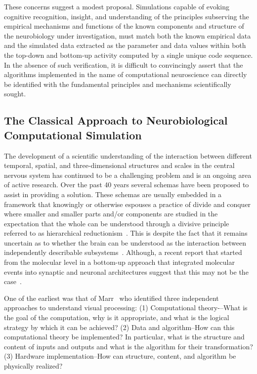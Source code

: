 \documentclass{article}
\begin{document}
These concerns suggest a modest proposal. Simulations capable of evoking cognitive recognition, insight, and understanding of the principles subserving the empirical mechanisms and functions of the known components and structure of the neurobiology under investigation, must match both the known empirical data and the simulated data extracted as the parameter and data values within both the top-down and bottom-up activity computed by a single unique code sequence. In the absence of such verification, it is difficult to convincingly assert that the algorithms implemented in the name of computational neuroscience can directly be identified with the fundamental principles and mechanisms scientifically sought.

\subsection{The Classical Approach to Neurobiological Computational Simulation}

The development of a scientific understanding of the interaction between different temporal, spatial, and three-dimensional structures and scales in the central nervous system has continued to be a challenging problem and is an ongoing area of active research.  Over the past 40 years several schemas have been proposed to assist in providing a solution.  These schemas are usually embedded in a framework that knowingly or otherwise espouses a practice of divide and conquer where smaller and smaller parts and/or components are studied in the expectation that the whole can be understood through a divisive principle referred to as hierarchical reductionism~\cite{dawkins06}. This is despite the fact that it remains uncertain as to whether the brain can be understood as the interaction between independently describable subsystems~\cite{djurfeldt08}. Although, a recent report that started from the molecular level in a bottom-up approach that integrated molecular events into synaptic and neuronal architectures suggest that this may not be the case~\cite{bouteiller11}.

One of the earliest was that of Marr~\cite{Marr:19821kx} who identified three independent approaches to understand visual processing: (1) Computational theory-–What is the goal of the computation, why is it appropriate, and what is the logical strategy by which it can be achieved? (2) Data and algorithm–How can this computational theory be implemented? In particular, what is the structure and content of inputs and outputs and what is the algorithm for their transformation? (3) Hardware implementation–How can structure, content, and algorithm be physically realized?
\end{document}
